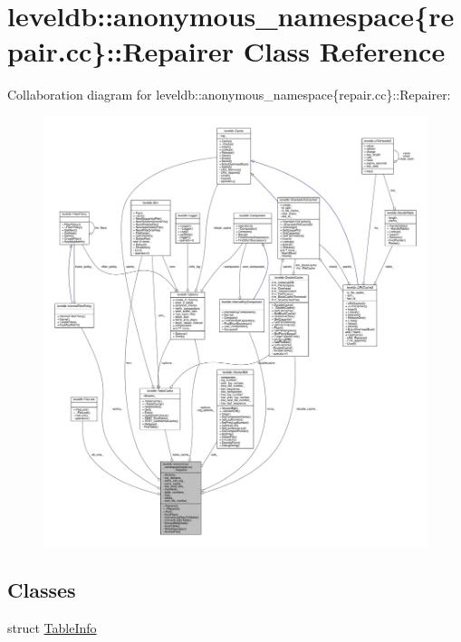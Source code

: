 \hypertarget{classleveldb_1_1anonymous__namespace_02repair_8cc_03_1_1_repairer}{}\section{leveldb\+:\+:anonymous\+\_\+namespace\{repair.\+cc\}\+:\+:Repairer Class Reference}
\label{classleveldb_1_1anonymous__namespace_02repair_8cc_03_1_1_repairer}


Collaboration diagram for leveldb\+:\+:anonymous\+\_\+namespace\{repair.\+cc\}\+:\+:Repairer\+:
\nopagebreak
\begin{figure}[H]
\begin{center}
\leavevmode
\includegraphics[width=350pt]{classleveldb_1_1anonymous__namespace_02repair_8cc_03_1_1_repairer__coll__graph}
\end{center}
\end{figure}
\subsection*{Classes}
\begin{DoxyCompactItemize}
\item 
struct \hyperlink{structleveldb_1_1anonymous__namespace_02repair_8cc_03_1_1_repairer_1_1_table_info}{Table\+Info}
\end{DoxyCompactItemize}
